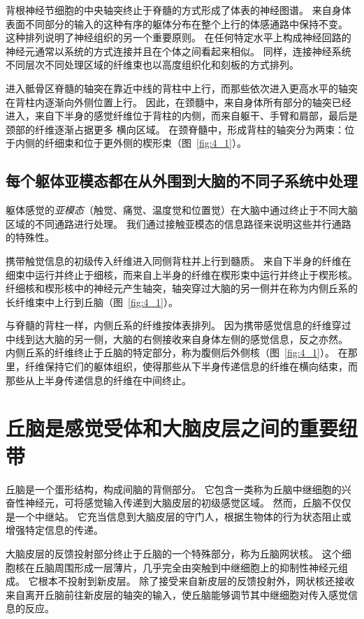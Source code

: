 背根神经节细胞的中央轴突终止于脊髓的方式形成了体表的神经图谱。
来自身体表面不同部分的输入的这种有序的躯体分布在整个上行的体感通路中保持不变。
这种排列说明了神经组织的另一个重要原则。
在任何特定水平上构成神经回路的神经元通常以系统的方式连接并且在个体之间看起来相似。 
同样，连接神经系统不同层次不同处理区域的纤维束也以高度组织化和刻板的方式排列。


进入骶骨区脊髓的轴突在靠近中线的背柱中上行，而那些依次进入更高水平的轴突在背柱内逐渐向外侧位置上行。 
因此，在颈髓中，来自身体所有部分的轴突已经进入，来自下半身的感觉纤维位于背柱的内侧，而来自躯干、手臂和肩部，最后是颈部的纤维逐渐占据更多 横向区域。 
在颈脊髓中，形成背柱的轴突分为两束：位于内侧的纤细束和位于更外侧的楔形束（图~\ref{fig:4_1}）。



\subsection{每个躯体亚模态都在从外围到大脑的不同子系统中处理}

躯体感觉的\textit{亚模态}（触觉、痛觉、温度觉和位置觉）在大脑中通过终止于不同大脑区域的不同通路进行处理。
我们通过接触亚模态的信息路径来说明这些并行通路的特殊性。


携带触觉信息的初级传入纤维进入同侧背柱并上行到髓质。
来自下半身的纤维在细束中运行并终止于细核，而来自上半身的纤维在楔形束中运行并终止于楔形核。 
纤细核和楔形核中的神经元产生轴突，轴突穿过大脑的另一侧并在称为内侧丘系的长纤维束中上行到丘脑（图~\ref{fig:4_1}）。


与脊髓的背柱一样，内侧丘系的纤维按体表排列。
因为携带感觉信息的纤维穿过中线到达大脑的另一侧，大脑的右侧接收来自身体左侧的感觉信息，反之亦然。 
内侧丘系的纤维终止于丘脑的特定部分，称为腹侧后外侧核（图~\ref{fig:4_1}）。 
在那里，纤维保持它们的躯体组织，使得那些从下半身传递信息的纤维在横向结束，而那些从上半身传递信息的纤维在中间终止。



\section{丘脑是感觉受体和大脑皮层之间的重要纽带}

丘脑是一个蛋形结构，构成间脑的背侧部分。 
它包含一类称为丘脑中继细胞的兴奋性神经元，可将感觉输入传递到大脑皮层的初级感觉区域。 
然而，丘脑不仅仅是一个中继站。 
它充当信息到大脑皮层的守门人，根据生物体的行为状态阻止或增强特定信息的传递。


大脑皮层的反馈投射部分终止于丘脑的一个特殊部分，称为丘脑网状核。 
这个细胞核在丘脑周围形成一层薄片，几乎完全由突触到中继细胞上的抑制性神经元组成。 
它根本不投射到新皮层。 
除了接受来自新皮层的反馈投射外，网状核还接收来自离开丘脑前往新皮层的轴突的输入，使丘脑能够调节其中继细胞对传入感觉信息的反应。


